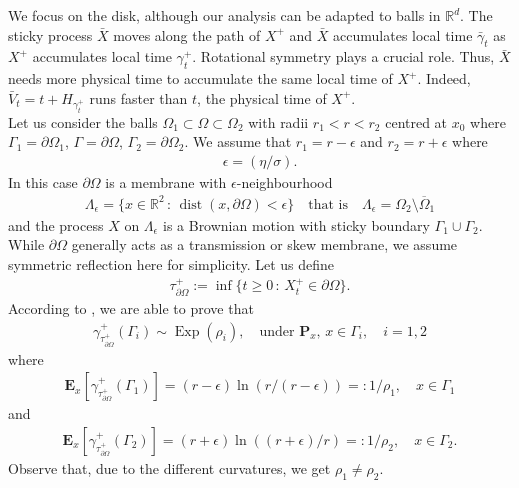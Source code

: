\documentclass[10pt,a4paper]{article}
\numberwithin{equation}{section}
\theoremstyle{plain}
\theoremstyle{remark}
\begin{document}
We focus on the disk, although our analysis can be adapted to balls in $\mathbb{R}^d$.   The sticky process $\bar{X}$ moves along the path of $X^+$ and $\bar{X}$ accumulates local time $\bar{\gamma}_t$ as $X^+$ accumulates local time $\gamma^+_t$. Rotational symmetry plays a crucial role. Thus, $\bar{X}$ needs more physical time to accumulate the same local time of $X^+$. Indeed, $\bar{V}_t = t + H_{\gamma^+_t}$ runs faster than $t$, the physical time of $X^+$.\\ 

Let us consider the balls $\Omega_1 \subset \Omega \subset \Omega_2$ with radii $r_1 < r <r_2$ centred at $x_0$  where $\Gamma_1= \partial \Omega_1$, $\Gamma= \partial \Omega$, $\Gamma_2= \partial \Omega_2$. We assume that $r_1 = r - \epsilon$ and $r_2=r + \epsilon$ where 
\begin{align*}
\epsilon = (\eta / \sigma).
\end{align*} 
In this case $\partial \Omega$ is a membrane with $\epsilon$-neighbourhood 
\begin{align*}
\Lambda_\epsilon = \{x \in \mathbb{R}^2\,:\, \operatorname{dist}(x, \partial \Omega) < \epsilon \} \quad \textrm{that is} \quad \Lambda_\epsilon = \Omega_2 \setminus \overline{\Omega}_1 
\end{align*}
and the process $X$ on $\Lambda_\epsilon$ is a Brownian motion with sticky boundary $\Gamma_1 \cup \Gamma_2$. While $\partial \Omega$ generally acts as a transmission or skew membrane, we assume symmetric reflection here for simplicity. Let us define
\begin{align*}
\tau^+_{\partial \Omega} :=\inf\{t\geq 0\,:\, X^+_t \in \partial \Omega \} .
\end{align*}
According to \cite[Remark 6.5]{EJP}, we are able to prove that 
\begin{align}
\gamma^+_{\tau^+_{\partial \Omega}}(\Gamma_i) \sim \operatorname{Exp}(\rho_i), \quad \textrm{under $\mathbf{P}_x$, $x \in \Gamma_i$}, \quad i=1,2
\label{expLocTim}
\end{align}
where 
\begin{align*}
\mathbf{E}_x[\gamma^+_{\tau^+_{\partial \Omega}}(\Gamma_1)] = (r-\epsilon) \ln (r/(r-\epsilon))=:1/\rho_1, \quad x \in \Gamma_1
\end{align*}
and 
\begin{align*}
\mathbf{E}_x[\gamma^+_{\tau^+_{\partial \Omega}}(\Gamma_2)] = (r+\epsilon) \ln ((r+\epsilon)/r)=:1/\rho_2, \quad x \in \Gamma_2.
\end{align*}
Observe that, due to the different curvatures, we get $\rho_1 \neq \rho_2$.\\
\end{document}
